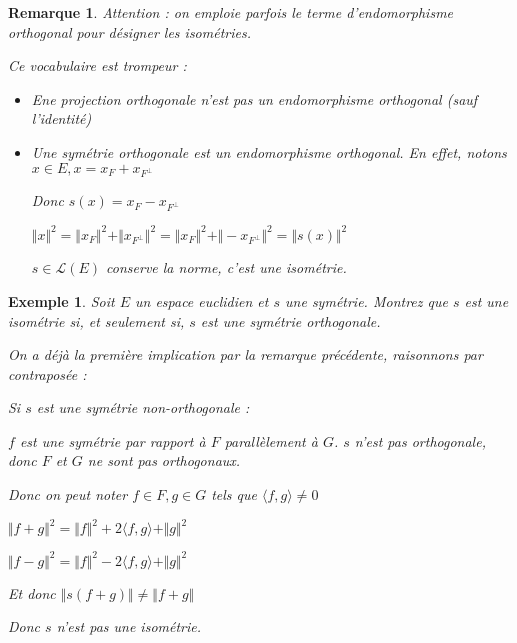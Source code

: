 \documentclass[a4paper,12pt]{book}
\newtheorem{Exe}{Exemple}[section]
\newtheorem{Rem}{Remarque}[section]
\begin{document}
\begin{Rem}
Attention : on emploie parfois le terme d'endomorphisme orthogonal pour désigner les isométries.
\par Ce vocabulaire est trompeur :\begin{itemize}
\item Ene projection orthogonale n'est pas un endomorphisme orthogonal (sauf l'identité)
\item Une symétrie orthogonale est un endomorphisme orthogonal. En effet, notons $x\in E, x= x_F + x_{F^\perp}$
\par Donc $s(x) = x_F-x_{F^\perp}$
\par $\Vert x\Vert^2 = \Vert x_F\Vert^2+\Vert x_{F^\perp}\Vert^2=\Vert x_F\Vert^2+\Vert -x_{F^\perp}\Vert^2 = \Vert s(x)\Vert^2$
\par $s\in\mathcal{L}(E)$ conserve la norme, c'est une isométrie.
\end{itemize}
\end{Rem}

\begin{Exe}
Soit $E$ un espace euclidien et $s$ une symétrie. Montrez que $s$ est une isométrie si, et seulement si, $s$ est une symétrie orthogonale.
\par On a déjà la première implication par la remarque précédente, raisonnons par contraposée :
\par Si $s$ est une symétrie non-orthogonale :
\par $f$ est une symétrie par rapport à $F$ parallèlement à $G$. $s$ n'est pas orthogonale, donc $F$ et $G$ ne sont pas orthogonaux.
\par Donc on peut noter $f\in F, g\in G$ tels que $\langle f, g\rangle\neq 0$
\par $\Vert f+g\Vert^2 =\Vert f\Vert^2+2\langle f, g\rangle+\Vert g\Vert^2$
\par $\Vert f-g\Vert^2 =\Vert f\Vert^2 - 2\langle f, g\rangle + \Vert g\Vert^2$
\par Et donc $\Vert s(f+g)\Vert\neq \Vert f+g\Vert$
\par Donc $s$ n'est pas une isométrie.
\end{Exe}
\end{document}
